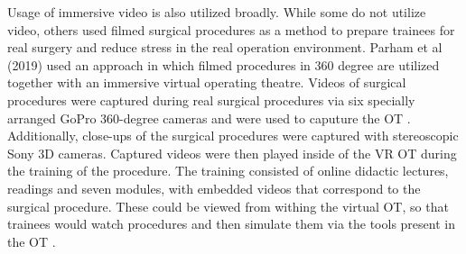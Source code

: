 \newline
Usage of immersive video is also utilized broadly.
While some do not utilize video, others used filmed surgical procedures as a method to prepare trainees for real surgery and reduce stress in the real operation environment.
\newline
Parham et al (2019) used an approach in which filmed procedures in 360 degree are utilized together with an immersive virtual operating theatre.
Videos of surgical procedures were captured during real surgical procedures via six specially arranged GoPro 360-degree cameras and were used to caputure the OT \cite{Parham.2019}.
Additionally, close-ups of the surgical procedures were captured with stereoscopic Sony 3D cameras.
\newline
Captured videos were then played inside of the VR OT during the training of the procedure.
The training consisted of online didactic lectures, readings and seven modules, with embedded videos that correspond to the surgical procedure.
These could be viewed from withing the virtual OT, so that trainees would watch procedures and then simulate them via the tools present in the OT \cite{Parham.2019}.